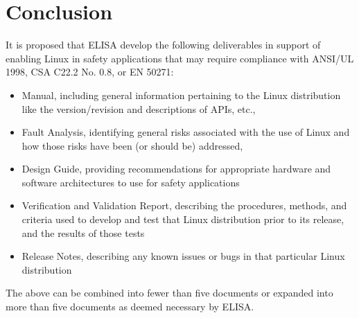 \documentclass[12pt]{../Common_files/ElisaPaper}
\begin{document}
\section{Conclusion}
It is proposed that ELISA develop the following deliverables in support of enabling Linux in safety applications that may require compliance with ANSI/UL 1998, CSA C22.2 No. 0.8, or EN 50271:

\begin{itemize}

\item Manual, including general information pertaining to the Linux distribution like the version/revision and descriptions of APIs, etc.,

\item Fault Analysis, identifying general risks associated with the use of Linux and how those risks have been (or should be) addressed,

\item Design Guide, providing recommendations for appropriate hardware and software architectures to use for safety applications


\item Verification and Validation Report, describing the procedures, methods, and criteria used to develop and test that Linux distribution prior to its release, and the results of those tests

\item Release Notes, describing any known issues or bugs in that particular Linux distribution

\end{itemize}

The above can be combined into fewer than five documents or expanded into more than five documents as deemed necessary by ELISA.

\cite{AnnexQR}
\cite{Example_citation}


{}

	
\end{document}
